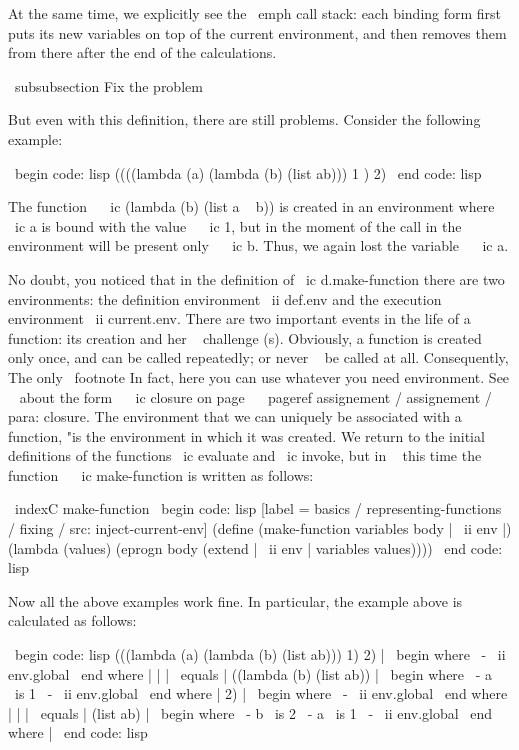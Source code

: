 {{At the same time, we explicitly see the \ emph {call stack}: each binding form first
puts its new variables on top of the current environment, and then removes them
from there after the end of the calculations.


\ subsubsection {Fix the problem}

But even with this definition, there are still problems. Consider the following
example:

\ begin {code: lisp}
((((lambda (a)
     (lambda (b) (list ab)))
  1 )
 2)
\ end {code: lisp}

The function ~ \ ic {(lambda (b) (list a ~ b))} is created in an environment where \ ic {a} is bound
with the value ~ \ ic {1}, but in the moment of the call in the environment will be present
only ~ \ ic {b}. Thus, we again lost the variable ~ \ ic {a}.

No doubt, you noticed that in the definition of \ ic {d.make-function} there are
two environments: the definition environment \ ii {def.env} and the execution environment
\ ii {current.env}. There are two important events in the life of a function: its creation and
her ~ challenge (s). Obviously, a function is created only once, and can be called
repeatedly; or never ~ be called at all. Consequently,
The only \ footnote {In fact, here you can use whatever you need
environment. See ~ about the form ~ \ ic {closure} on
page ~ \ pageref {assignement / assignement / para: closure}.} The environment that we
can uniquely be associated with a ~ function, "is the environment in which it was
created. We return to the initial definitions of the functions \ ic {evaluate} and \ ic {invoke},
but in ~ this time the function ~ \ ic {make-function} is written as follows:

\ indexC {make-function}
\ begin {code: lisp} [label = basics / representing-functions / fixing / src: inject-current-env]
(define (make-function variables body | \ ii {env} |)
  (lambda (values)
    (eprogn body (extend | \ ii {env} | variables values))))
\ end {code: lisp}

Now all the above examples work fine. In particular, the example above
is calculated as follows:

\ begin {code: lisp}
(((lambda (a) (lambda (b) (list ab))) 1) 2) | \ begin {where}
                                             \ -  \ ii {env.global}
                                             \ end {where} |
| | \ equals | ((lambda (b) (list ab)) | \ begin {where}
                                   \ - a { \ is } 1
                                   \ -  \ ii {env.global}
                                   \ end {where} |
    2) | \ begin {where}
        \ -  \ ii {env.global}
        \ end {where} |
| | \ equals | (list ab) | \ begin {where}
                     \ - b { \ is } 2
                     \ - a { \ is } 1
                     \ -  \ ii {env.global}
                     \ end {where} |
\ end {code: lisp}

}}
